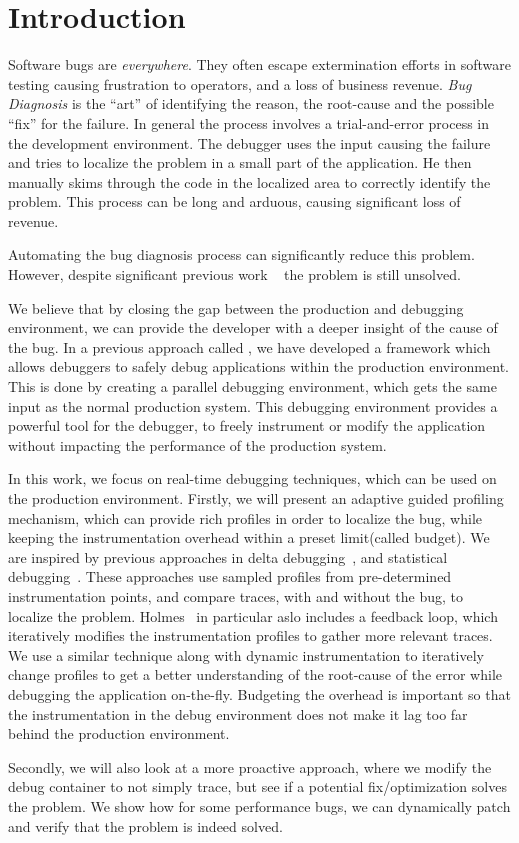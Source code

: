 \section{Introduction}
\label{sec:introduction}

Software bugs are \emph{everywhere}.
They often escape extermination efforts in software testing causing frustration to operators, and a loss of business revenue.
\emph{Bug Diagnosis} is the ``art'' of identifying the reason, the root-cause and the possible ``fix'' for the failure.
In general the process involves a trial-and-error process in the development environment. 
The debugger uses the input causing the failure and tries to localize the problem in a small part of the application.
He then manually skims through the code in the localized area to correctly identify the problem.
This process can be long and arduous, causing significant loss of revenue.

Automating the bug diagnosis process can significantly reduce this problem.
However, despite significant previous work ~\cite{gdb} the problem is still unsolved.

We believe that by closing the gap between the production and debugging environment, we can provide the developer with a deeper insight of the cause of the bug.
In a previous approach called \livedebugging, we have developed a framework which allows debuggers to safely debug applications within the production environment.
This is done by creating a parallel debugging environment, which gets the same input as the normal production system.
This debugging environment provides a powerful tool for the debugger, to freely instrument or modify the application without impacting the performance of the production system.

In this work, we focus on real-time debugging techniques, which can be used on the production environment.
Firstly, we will present an adaptive guided profiling mechanism, which can provide rich profiles in order to localize the bug, while keeping the instrumentation overhead within a preset limit(called budget).
We are inspired by previous approaches in delta debugging~\cite{delta}, and statistical debugging~\cite{statistical, holmes}. 
These approaches use sampled profiles from pre-determined instrumentation points, and compare traces, with and without the bug, to localize the problem.
Holmes~\cite{holmes} in particular aslo includes a feedback loop, which iteratively modifies the instrumentation profiles to gather more relevant traces.
We use a similar technique along with dynamic instrumentation to iteratively change profiles to get a better understanding of the root-cause of the error while debugging the application on-the-fly.
Budgeting the overhead is important so that the instrumentation in the debug environment does not make it lag too far behind the production environment.

Secondly, we will also look at a more proactive approach, where we modify the debug container to not simply trace, but see if a potential fix/optimization solves the problem.
We show how for some performance bugs, we can dynamically patch and verify that the problem is indeed solved.
